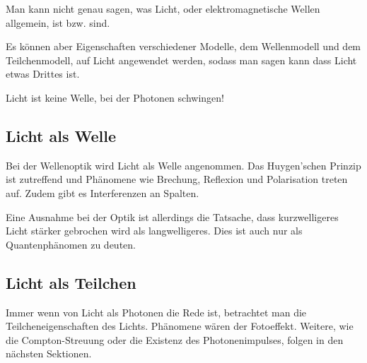 Man kann nicht genau sagen, was Licht, oder elektromagnetische Wellen allgemein, ist bzw. sind.

Es können aber Eigenschaften verschiedener Modelle, dem Wellenmodell und dem Teilchenmodell, auf Licht angewendet werden, sodass man sagen kann dass Licht etwas \glqq Drittes\grqq{} ist.

\begin{Wichtig}
	Licht ist keine Welle, bei der Photonen schwingen!
\end{Wichtig}

\subsection{Licht als Welle}

Bei der Wellenoptik wird Licht als Welle angenommen. Das Huygen'schen Prinzip ist zutreffend und Phänomene wie Brechung, Reflexion und Polarisation treten auf. Zudem gibt es Interferenzen an Spalten.

Eine Ausnahme bei der Optik ist allerdings die Tatsache, dass kurzwelligeres Licht stärker gebrochen wird als langwelligeres. Dies ist auch nur als Quantenphänomen zu deuten.


\subsection{Licht als Teilchen}

Immer wenn von Licht als Photonen die Rede ist, betrachtet man die Teilcheneigenschaften des Lichts. Phänomene wären der Fotoeffekt. Weitere, wie die Compton-Streuung oder die Existenz des Photonenimpulses, folgen in den nächsten Sektionen.